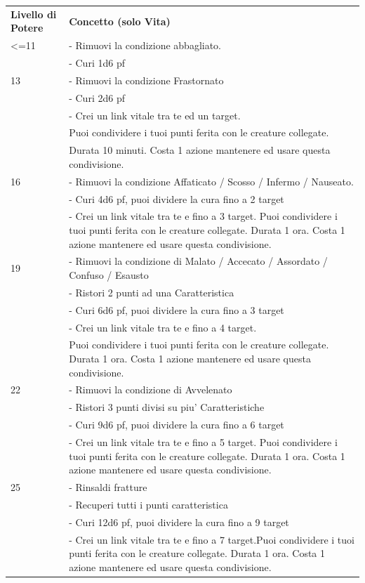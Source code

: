 \documentclass[a4paper,11pt,twoside,openany]{book}
\begin{document}
\begin{longtable}{L{3cm} L{13cm}}
\toprule
\textbf{Livello di Potere} & \textbf{Concetto (solo Vita)}\tabularnewline	
<=11 & - Rimuovi la condizione abbagliato.\\
& - Curi 1d6 pf\\
13 & - Rimuovi la condizione Frastornato\\
& - Curi 2d6 pf\\
& - Crei un link vitale tra te ed un target.\\
& Puoi condividere i tuoi punti ferita con le creature collegate.\\
& Durata 10 minuti. Costa 1 azione mantenere ed usare questa condivisione. \\
16 & - Rimuovi la condizione Affaticato / Scosso / Infermo / Nauseato.\\
& - Curi 4d6 pf, puoi dividere la cura fino a 2 target\\
& - Crei un link vitale tra te e fino a 3 target. Puoi condividere i tuoi punti ferita con le creature collegate. Durata 1 ora. Costa 1 azione mantenere ed usare questa condivisione.\\
19 & - Rimuovi la condizione di Malato / Accecato / Assordato / Confuso / Esausto\\
& - Ristori 2 punti ad una Caratteristica\\
& - Curi 6d6 pf, puoi dividere la cura fino a 3 target\\
& - Crei un link vitale tra te e fino a 4 target.\\
& Puoi condividere i tuoi punti ferita con le creature collegate. Durata 1 ora. Costa 1 azione mantenere ed usare questa condivisione.\\
22 &- Rimuovi la condizione di Avvelenato\\
& - Ristori 3 punti divisi su piu' Caratteristiche\\
& - Curi 9d6 pf, puoi dividere la cura fino a 6 target\\
&- Crei un link vitale tra te e fino a 5 target. Puoi condividere i tuoi punti ferita con le creature collegate. Durata 1 ora. Costa 1 azione mantenere ed usare questa condivisione.\\
25 & - Rinsaldi fratture\\
& - Recuperi tutti i punti caratteristica\\
& - Curi 12d6 pf, puoi dividere la cura fino a 9 target\\
& - Crei un link vitale tra te e fino a 7 target.Puoi condividere i tuoi punti ferita con le creature collegate. Durata 1 ora. Costa 1 azione mantenere ed usare questa condivisione.\\

\end{longtable}
\end{document}
